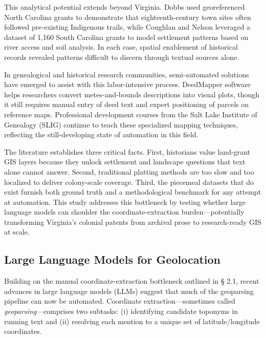 This analytical potential extends beyond Virginia. Dobbs
\citep{Dobbs2009_backcountry} used georeferenced North Carolina grants
to demonstrate that eighteenth-century town sites often followed
pre-existing Indigenous trails, while Coughlan and Nelson
\citep{Coughlan2018_settlement} leveraged a dataset of 1,160 South
Carolina grants to model settlement patterns based on river access and
soil analysis. In each case, spatial enablement of historical records
revealed patterns difficult to discern through textual sources alone.

In genealogical and historical research communities, semi-automated
solutions have emerged to assist with this labor-intensive process.
DeedMapper software \citep{DeedMapper_software} helps researchers
convert metes-and-bounds descriptions into visual plots, though it still
requires manual entry of deed text and expert positioning of parcels on
reference maps. Professional development courses from the Salt Lake
Institute of Genealogy (SLIG) continue to teach these specialized
mapping techniques, reflecting the still-developing state of automation
in this field.

The literature establishes three critical facts. First, historians value
land-grant GIS layers because they unlock settlement and landscape
questions that text alone cannot answer. Second, traditional platting
methods are too slow and too localized to deliver colony-scale coverage.
Third, the piecemeal datasets that do exist furnish both ground truth
and a methodological benchmark for any attempt at automation. This study
addresses this bottleneck by testing whether large language models can
shoulder the coordinate-extraction burden---potentially transforming
Virginia's colonial patents from archival prose to research-ready GIS at
scale.

\subsection{Large Language Models for
Geolocation}\label{large-language-models-for-geolocation}

Building on the manual coordinate-extraction bottleneck outlined in §
2.1, recent advances in large language models (LLMs) suggest that much
of the geoparsing pipeline can now be automated. Coordinate
extraction---sometimes called \emph{geoparsing}---comprises two
subtasks: (i) identifying candidate toponyms in running text and (ii)
resolving each mention to a unique set of latitude/longitude
coordinates.

